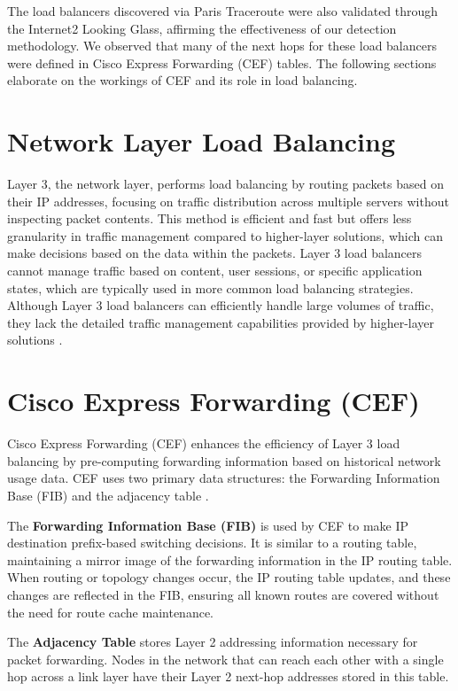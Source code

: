 \documentclass[12pt]{cwru_thesis}
\begin{document}
The load balancers discovered via Paris Traceroute were also validated through the Internet2 Looking Glass, affirming the effectiveness of our detection methodology. We observed that many of the next hops for these load balancers were defined in Cisco Express Forwarding (CEF) tables. The following sections elaborate on the workings of CEF and its role in load balancing.

\section{Network Layer Load Balancing}

Layer 3, the network layer, performs load balancing by routing packets based on their IP addresses, focusing on traffic distribution across multiple servers without inspecting packet contents. This method is efficient and fast but offers less granularity in traffic management compared to higher-layer solutions, which can make decisions based on the data within the packets. Layer 3 load balancers cannot manage traffic based on content, user sessions, or specific application states, which are typically used in more common load balancing strategies. Although Layer 3 load balancers can efficiently handle large volumes of traffic, they lack the detailed traffic management capabilities provided by higher-layer solutions \cite{zhang}.

\section{Cisco Express Forwarding (CEF)}

Cisco Express Forwarding (CEF) enhances the efficiency of Layer 3 load balancing by pre-computing forwarding information based on historical network usage data. CEF uses two primary data structures: the Forwarding Information Base (FIB) and the adjacency table \cite{cisco2017cef}.

The \textbf{Forwarding Information Base (FIB)} is used by CEF to make IP destination prefix-based switching decisions. It is similar to a routing table, maintaining a mirror image of the forwarding information in the IP routing table. When routing or topology changes occur, the IP routing table updates, and these changes are reflected in the FIB, ensuring all known routes are covered without the need for route cache maintenance.

The \textbf{Adjacency Table} stores Layer 2 addressing information necessary for packet forwarding. Nodes in the network that can reach each other with a single hop across a link layer have their Layer 2 next-hop addresses stored in this table. 
\end{document}

